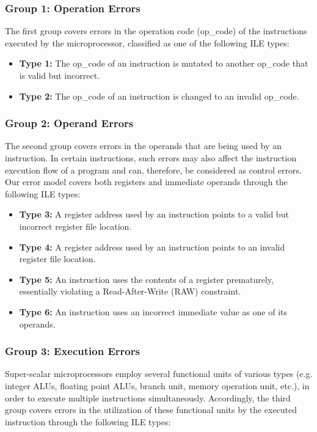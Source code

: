 \documentclass[12pt]{yalephd}
\begin{document}
\subsubsection{Group 1: Operation Errors}

The first group covers errors in the operation code (op\_code) of the instructions executed by the microprocessor, classified as one of the following ILE types:

\begin{itemize}
\item{\bf{Type 1:}} The op\_code of an instruction is mutated to another op\_code that is valid but incorrect.
\item{\bf{Type 2:}} The op\_code of an instruction is changed to an invalid op\_code.
\end{itemize}

\subsubsection{Group 2: Operand Errors}

The second group covers errors in the operands that are being used by an instruction. In certain instructions, such errors may also affect the instruction execution flow of a program and can, therefore, be considered as control errors. Our error model covers both registers and immediate operands through the following ILE types:

\begin{itemize}
\item{\bf{Type 3:}} A register address used by an instruction points
to a valid but incorrect register file location.
\item{\bf{Type 4:}} A register address used by an instruction
points to an invalid register file location.
\item{\bf{Type 5:}} An instruction uses the contents of a
register prematurely, essentially violating a Read-After-Write (RAW)
constraint.
\item{\bf{Type 6:}} An instruction uses an incorrect immediate value as one of its operands.
\end{itemize}

\subsubsection{Group 3: Execution Errors}
Super-scalar microprocessors employ several functional units of various types (e.g. integer ALUs, floating point ALUs, branch unit, memory operation unit, etc.), in order to execute multiple instructions simultaneously. Accordingly, the third group covers errors in the utilization of these functional units by the executed instruction through the following ILE types:
\end{document}
